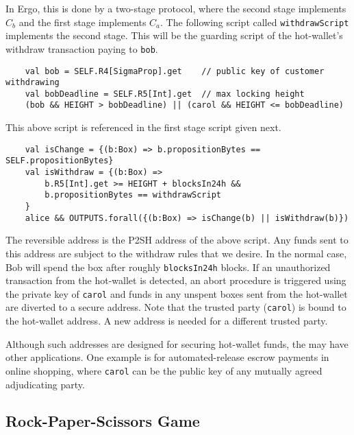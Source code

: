 \documentclass[runningheads]{llncs}
\begin{document}
In Ergo, this is done by a two-stage protocol, where the second stage implements $C_{b}$ and the first stage implements $C_{a}$. 
The following script called \texttt{withdrawScript} implements the second stage. This will be the guarding script of the hot-wallet's withdraw transaction paying to \texttt{bob}.

\small{
	\begin{verbatim}
	val bob = SELF.R4[SigmaProp].get    // public key of customer withdrawing
	val bobDeadline = SELF.R5[Int].get  // max locking height
	(bob && HEIGHT > bobDeadline) || (carol && HEIGHT <= bobDeadline)
	\end{verbatim}
}

This above script is referenced in the first stage script given next. 

\small{
	\begin{verbatim}
	val isChange = {(b:Box) => b.propositionBytes == SELF.propositionBytes}
	val isWithdraw = {(b:Box) => 
	    b.R5[Int].get >= HEIGHT + blocksIn24h && 
	    b.propositionBytes == withdrawScript
	}
	alice && OUTPUTS.forall({(b:Box) => isChange(b) || isWithdraw(b)})
	\end{verbatim}
}

The reversible address is the P2SH address of the above script. Any funds sent to this address are subject to the withdraw rules that we desire.
In the normal case, Bob will spend the box after roughly \texttt{blocksIn24h} blocks. If an unauthorized transaction from the hot-wallet is detected, an abort procedure is triggered using the private key of \texttt{carol} and funds in any unspent boxes sent from the hot-wallet are diverted to a secure address. %
Note that the trusted party (\texttt{carol}) is bound to the hot-wallet address. A new address is needed for a different trusted party. 

Although such addresses are designed for securing hot-wallet funds, the may have other applications. One example is for automated-release escrow payments in online shopping, where \texttt{carol} can be the public key of any mutually agreed adjudicating party. 

\subsection{Rock-Paper-Scissors Game}
\label{rps}
\end{document}
